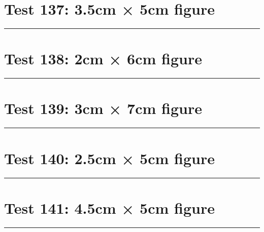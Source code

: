\documentclass[a4paper,11pt]{article}
\begin{document}
\section*{Test 137: 3.5cm × 5cm figure}
\begin{swarmwrap}%
  \begin{minipage}[t]{3cm}
    \centering
    \rule{\linewidth}{5cm}
  \end{minipage}%
\end{swarmwrap}%
\swarmwrapnext
\lipsum[114]
\lipsum[115]
\lipsum[116]
\lipsum[117]
\lipsum[118]
\section*{Test 138: 2cm × 6cm figure}
\begin{swarmwrap}%
  \begin{minipage}[t]{2cm}
    \centering
    \rule{\linewidth}{6cm}
  \end{minipage}%
\end{swarmwrap}%
\swarmwrapnext
\lipsum[71]
\lipsum[72]
\lipsum[73]
\lipsum[74]
\section*{Test 139: 3cm × 7cm figure}
\begin{swarmwrap}%
  \begin{minipage}[t]{3cm}
    \centering
    \rule{\linewidth}{7cm}
  \end{minipage}%
\end{swarmwrap}%
\swarmwrapnext
\lipsum[37]
\lipsum[38]
\lipsum[39]
\section*{Test 140: 2.5cm × 5cm figure}
\begin{swarmwrap}%
  \begin{minipage}[t]{2cm}
    \centering
    \rule{\linewidth}{5cm}
  \end{minipage}%
\end{swarmwrap}%
\swarmwrapnext
\lipsum[41]
\lipsum[42]
\lipsum[43]
\lipsum[44]
\lipsum[45]
\lipsum[46]
\section*{Test 141: 4.5cm × 5cm figure}
\begin{swarmwrap}%
  \begin{minipage}[t]{4cm}
    \centering
    \rule{\linewidth}{5cm}
  \end{minipage}%
\end{swarmwrap}%
\swarmwrapnext
\lipsum[108]
\lipsum[109]
\lipsum[110]
\end{document}
